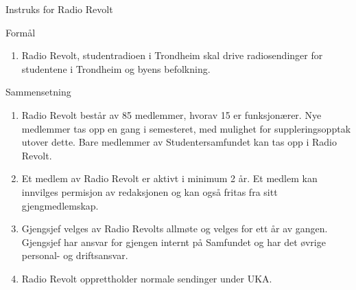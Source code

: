 \documentclass[../../fsbok.tex]{subfiles}
\begin{document}
\begin{instruks*}{Instruks for Radio Revolt}

    \begin{instruksledd}{Formål}
        \begin{enumerate}
            \item Radio Revolt, studentradioen i Trondheim skal drive radiosendinger for studentene
                i Trondheim og byens befolkning.
        \end{enumerate}
    \end{instruksledd}

    \begin{instruksledd}{Sammensetning}
        \begin{enumerate}
            \item Radio Revolt består av 85 medlemmer, hvorav 15 er funksjonærer. Nye medlemmer tas
                opp en gang i semesteret, med mulighet for suppleringsopptak utover dette. Bare medlemmer av
                Studentersamfundet kan tas opp i Radio Revolt.
            \item Et medlem av Radio Revolt er aktivt i minimum 2 år. Et medlem kan innvilges permisjon av
                redaksjonen og kan også fritas fra sitt gjengmedlemskap.
            \item Gjengsjef velges av Radio Revolts allmøte og velges for ett år av gangen. Gjengsjef har ansvar for gjengen internt på
Samfundet og har det øvrige personal- og driftsansvar.
            \item Radio Revolt opprettholder normale sendinger under UKA.
        \end{enumerate}
    \end{instruksledd}
    

\end{instruks*}
\end{document}
